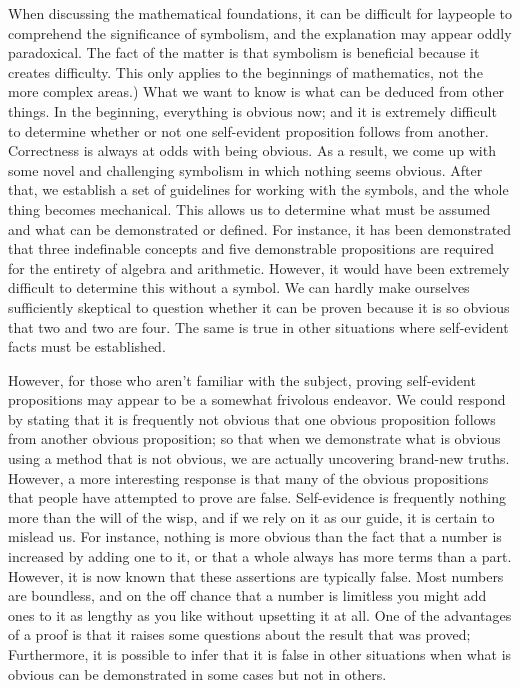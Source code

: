 \documentclass[a4paper,12pt]{book}[2004/02/16]
\theoremstyle{ilemma}
\theoremstyle{itheorem}
\theoremstyle{iother}
\theoremstyle{icorollary}
\theoremstyle{numcorollary}
\theoremstyle{idefinition}
\begin{document}
When discussing the mathematical foundations, it can be difficult for laypeople to comprehend the significance of symbolism, and the explanation may appear oddly paradoxical. The fact of the matter is that symbolism is beneficial because it creates difficulty. This only applies to the beginnings of mathematics, not the more complex areas.) What we want to know is what can be deduced from other things. In the beginning, everything is obvious now; and it is extremely difficult to determine whether or not one self-evident proposition follows from another.
Correctness is always at odds with being obvious. As a result, we come up with some novel and challenging symbolism in which nothing seems obvious. After that, we establish a set of guidelines for working with the symbols, and the whole thing becomes mechanical. This allows us to determine what must be assumed and what can be demonstrated or defined. For instance, it has been demonstrated that three indefinable concepts and five demonstrable propositions are required for the entirety of algebra and arithmetic. However, it would have been extremely difficult to determine this without a symbol. We can hardly make ourselves sufficiently skeptical to question whether it can be proven because it is so obvious that two and two are four. The same is true in other situations where self-evident facts must be established.

However, for those who aren't familiar with the subject, proving self-evident propositions may appear to be a somewhat frivolous endeavor. We could respond by stating that it is frequently not obvious that one obvious proposition follows from another obvious proposition; so that when we demonstrate what is obvious using a method that is not obvious, we are actually uncovering brand-new truths. However, a more interesting response is that many of the obvious propositions that people have attempted to prove are false. Self-evidence is frequently nothing more than the will of the wisp, and if we rely on it as our guide, it is certain to mislead us. For instance, nothing is more obvious than the fact that a number is increased by adding one to it, or that a whole always has more terms than a part. However, it is now known that these assertions are typically false. Most numbers are
boundless, and on the off chance that a number is limitless you might add ones to it as lengthy
as you like without upsetting it at all. One of the advantages of a proof is that it raises some questions about the result that was proved; Furthermore, it is possible to infer that it is false in other situations when what is obvious can be demonstrated in some cases but not in others.
\end{document}
